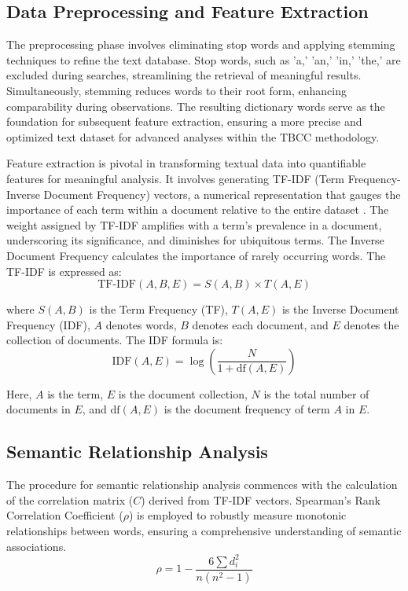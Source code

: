 \documentclass{article}
\begin{document}
\subsection{Data Preprocessing and Feature Extraction}
The preprocessing phase involves eliminating stop words and applying stemming techniques to refine the text database. Stop words, such as 'a,' 'an,' 'in,' 'the,' are excluded during searches, streamlining the retrieval of meaningful results. Simultaneously, stemming reduces words to their root form, enhancing comparability during observations. The resulting dictionary words serve as the foundation for subsequent feature extraction, ensuring a more precise and optimized text dataset for advanced analyses within the TBCC methodology.

 Feature extraction is pivotal in transforming textual data into quantifiable features for meaningful analysis. It involves generating TF-IDF (Term Frequency-Inverse Document Frequency) vectors, a numerical representation that gauges the importance of each term within a document relative to the entire dataset \cite{ref1}. The weight assigned by TF-IDF amplifies with a term's prevalence in a document, underscoring its significance, and diminishes for ubiquitous terms. The Inverse Document Frequency calculates the importance of rarely occurring words. The TF-IDF is expressed as:
\[ \text{TF-IDF}(A, B, E) = S(A, B) \times T(A, E) \]

where \( S(A, B) \) is the Term Frequency (TF), \( T(A, E) \) is the Inverse Document Frequency (IDF), \( A \) denotes words, \( B \) denotes each document, and \( E \) denotes the collection of documents. The IDF formula is:
\[ \text{IDF}(A, E) = \log\left(\frac{N}{1 + \text{df}(A, E)}\right) \]

Here, \( A \) is the term, \( E \) is the document collection, \( N \) is the total number of documents in \( E \), and \( \text{df}(A, E) \) is the document frequency of term \( A \) in \( E \).



 \subsection{Semantic Relationship Analysis}

The procedure for semantic relationship analysis commences with the calculation of the correlation matrix ($C$) derived from TF-IDF vectors. Spearman's Rank Correlation Coefficient ($\rho$) is employed to robustly measure monotonic relationships between words, ensuring a comprehensive understanding of semantic associations.
\[ \rho = 1 - \frac{6 \sum d_i^2}{n(n^2 - 1)} \]
\end{document}
